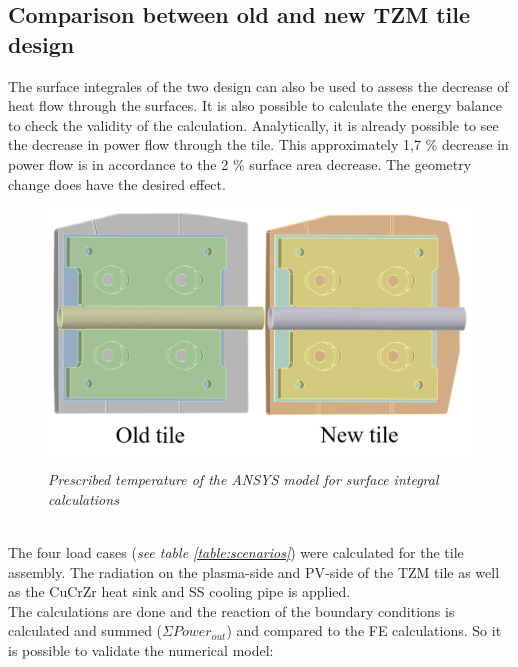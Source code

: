 \subsection{Comparison between old and new TZM tile design}
\normalsize{The surface integrales of the two design can also be used to assess the decrease of heat flow through the surfaces. It is also possible to calculate the energy balance to check the validity of the calculation. Analytically, it is already possible to see the decrease in power flow through the tile. This approximately 1,7 \% decrease in power flow is in accordance to the 2 \% surface area decrease. The geometry change does have the desired effect.}
\\
\begin{figure}[h!]
    \label{fig_5_6} 
    \centering
    \includegraphics[width=.51\textwidth]{figures/energybalancemodel.png}
    \caption{\it Prescribed temperature of the ANSYS\textsuperscript{\textregistered} model for surface integral calculations}
\end{figure}
\\
\normalsize{\indent The four load cases ({\it see table \ref{table:scenarios}}) were calculated for the tile assembly. The radiation on the plasma-side and \acrshort{PV}-side of the \acrshort{TZM} tile as well as the \acrshort{CuCrZr} heat sink and \acrshort{SS} cooling pipe is applied.}
\\
\break
\normalsize{\indent The calculations are done and the reaction of the boundary conditions is calculated and summed ($\Sigma Power_{out}$) and compared to the \acrshort{FE} calculations. So it is possible to validate the numerical model:}

